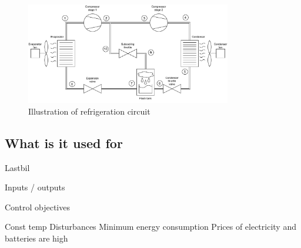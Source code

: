 \begin{figure}[h!]
	\centering
	\includegraphics[width=0.8\textwidth]{Graphics/HVAC_Diagram_Fans.pdf}
	\caption{Illustration of refrigeration circuit}
	\label{fig:HVAC_Diagram}
\end{figure}





\subsection{What is it used for}
	Lastbil
	
	
Inputs / outputs

Control objectives

	Const temp
		Disturbances
	Minimum energy consumption
		Prices of electricity and batteries are high
		
